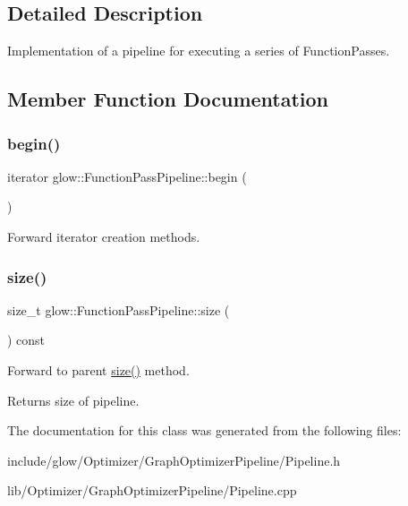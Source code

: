 \subsection{Detailed Description}
Implementation of a pipeline for executing a series of Function\+Passes. 

\subsection{Member Function Documentation}
\mbox{\label{classglow_1_1_function_pass_pipeline_a83ba1e6d68321e940295252d4e646b2e}} 
\subsubsection{\texorpdfstring{begin()}{begin()}}
{\footnotesize\ttfamily iterator glow\+::\+Function\+Pass\+Pipeline\+::begin (\begin{DoxyParamCaption}{ }\end{DoxyParamCaption})\hspace{0.3cm}{\ttfamily [inline]}}

Forward iterator creation methods. \mbox{\label{classglow_1_1_function_pass_pipeline_acf021b258120117a9235f8b3226d97bf}} 
\subsubsection{\texorpdfstring{size()}{size()}}
{\footnotesize\ttfamily size\+\_\+t glow\+::\+Function\+Pass\+Pipeline\+::size (\begin{DoxyParamCaption}{ }\end{DoxyParamCaption}) const\hspace{0.3cm}{\ttfamily [inline]}}



Forward to parent \hyperlink{classglow_1_1_function_pass_pipeline_acf021b258120117a9235f8b3226d97bf}{size()} method. 

\begin{DoxyReturn}{Returns}
size of pipeline. 
\end{DoxyReturn}


The documentation for this class was generated from the following files\+:\begin{DoxyCompactItemize}
\item 
include/glow/\+Optimizer/\+Graph\+Optimizer\+Pipeline/Pipeline.\+h\item 
lib/\+Optimizer/\+Graph\+Optimizer\+Pipeline/Pipeline.\+cpp\end{DoxyCompactItemize}
